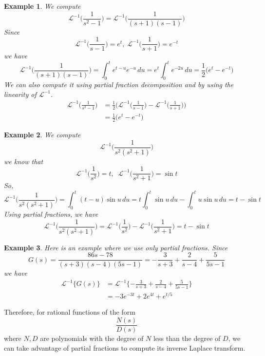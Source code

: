 \documentclass{article}
\newtheorem{example}{Example}[section]
\theoremstyle{remark}
\theoremstyle{definition}
\begin{document}
    \begin{example}
    We compute 
    \[\mathcal{L}^{-1} \bigg( \frac{1}{s^2 -1}\bigg) =\mathcal{L}^{-1} \bigg( \frac{1}{(s+1)(s-1)}\bigg)\]
    Since 
    \[\mathcal{L}^{-1} \bigg(\frac{1}{s-1}\bigg) = e^t, \; \mathcal{L}^{-1}\bigg(\frac{1}{s+1}\bigg) = e^{-t}\]
    we have
    \[\mathcal{L}^{-1} \bigg(\frac{1}{(s+1)(s-1)}\bigg) = \int_0^t e^{t-u} e^{-u} \,du = e^t \int_0^t e^{-2u} \,du = \frac{1}{2} \big(e^t - e^{-t}\big)\]
    We can also compute it using partial fraction decomposition and by using the linearity of $\mathcal{L}^{-1}$. 
    \begin{align*}
        \mathcal{L}^{-1} \bigg( \frac{1}{s^2-1}\bigg) & = \frac{1}{2} \Bigg( \mathcal{L}^{-1} \bigg( \frac{1}{s-1} \bigg) - \mathcal{L}^{-1} \bigg(\frac{1}{s+1}\bigg) \Bigg) \\
        & = \frac{1}{2} \big( e^t - e^{-t} \big) 
    \end{align*}
    \end{example}

    \begin{example}
    We compute 
    \[\mathcal{L}^{-1} \bigg( \frac{1}{s^2(s^2 + 1)}\bigg)\]
    we know that
    \[\mathcal{L}^{-1} \bigg(\frac{1}{s^2}\bigg) = t, \;\; \mathcal{L}^{-1} \bigg( \frac{1}{s^2+1}\bigg) = \sin{t}\]
    So,
    \[\mathcal{L}^{-1} \bigg( \frac{1}{s^2 (s^2+1)}\bigg) = \int_0^t (t-u) \sin{u} \,du = t \int_0^t \sin{u}\,du - \int_0^t u \sin{u}\,du = t - \sin{t}\]
    Using partial fractions, we have
    \[\mathcal{L}^{-1} \bigg(\frac{1}{s^2(s^2 + 1)} \bigg) = \mathcal{L}^{-1} \bigg( \frac{1}{s^2} \bigg) - \mathcal{L}^{-1} \bigg(\frac{1}{s^2 + 1} \bigg) = t - \sin{t}\]
    \end{example}

    \begin{example}
    Here is an example where we use only partial fractions. Since
    \[G(s) = \frac{86 s - 78}{(s+3) (s - 4) (5s - 1)} = -\frac{3}{s+3} + \frac{2}{s-4} + \frac{5}{5s-1}\]
    we have 
    \begin{align*}
        \mathcal{L}^{-1} \{G(s)\} & = \mathcal{L}^{-1} \{-\frac{3}{s+3} + \frac{2}{s-4} + \frac{5}{5s-1}\} \\
        & = -3 e^{-3t} + 2 e^{4 t} + e^{t/5}
    \end{align*}
    \end{example}

    Therefore, for rational functions of the form 
    \[\frac{N(s)}{D(s)}\]
    where $N, D$ are polynomials with the degree of $N$ less than the degree of $D$, we can take advantage of partial fractions to compute its inverse Laplace transform. 
\end{document}
